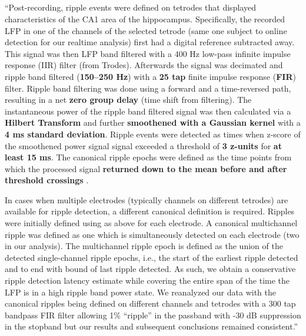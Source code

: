 \subsection{}

``Post-recording, ripple events were defined on tetrodes that displayed characteristics of the CA1 area of the hippocampus. Specifically, the recorded LFP in one of the channels of the selected tetrode (same one subject to online detection for our realtime analysis) first had a digital reference subtracted away. This signal was then LFP band filtered with a 400 Hz low-pass infinite impulse response (IIR) filter (from Trodes). Afterwards the signal was decimated and ripple band filtered (\textbf{150–250 Hz}) with a \textbf{25 tap} finite impulse response (\textbf{FIR}) filter. Ripple band filtering was done using a forward and a time-reversed path, resulting in a net \textbf{zero group delay} (time shift from filtering). The instantaneous power of the ripple band filtered signal was then calculated via a \textbf{Hilbert Transform} and further \textbf{smoothened with a Gaussian kernel} with a \textbf{4 ms standard deviation}. Ripple events were detected as times when z-score of the smoothened power signal signal exceeded a threshold of \textbf{3 z-units} for \textbf{at least 15 ms}. The canonical ripple epochs were defined as the time points from which the processed signal \textbf{returned down to the mean before and after threshold crossings} \cite{Cheng2008,Kemere2013}.

In cases when multiple electrodes (typically channels on different tetrodes) are available for ripple detection, a different canonical definition is required. Ripples were initially defined using as above for each electrode. A canonical multichannel ripple was defined as one which is simultaneously detected on each electrode (two in our analysis). The multichannel ripple epoch is defined as the union of the detected single-channel ripple epochs, i.e., the start of the earliest ripple detected and to end with bound of last ripple detected. As such, we obtain a conservative ripple detection latency estimate while covering the entire span of the time the LFP is in a high ripple band power state. We reanalyzed our data with the canonical ripples being defined on different channels and tetrodes with a 300 tap bandpass FIR filter allowing 1\% “ripple” in the passband with -30 dB suppression in the stopband but our results and subsequent conclusions remained consistent.'' \cite{Dutta2018}





